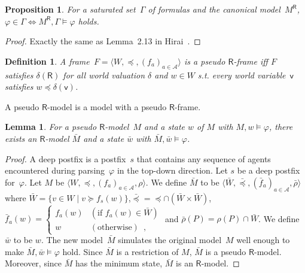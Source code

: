 \documentclass[doctor]{iscs-thesis}
\newcommand{\agents}{\mathcal A}
\newcommand{\tuple}[1]{\langle{#1}\rangle}
\newcommand{\R}[1]{{#1}^{\mathsf R}}
\newtheorem{proposition}{Proposition}
\newtheorem{definition}{Definition}
\newtheorem{lemma}{Lemma}
\begin{document}
\begin{proposition}
 \label{X}
 For a saturated set~$\Gamma$ of formulas and the canonical model~$\R
 M$,
 $\varphi\in\Gamma\Leftrightarrow \R M,\Gamma\models\varphi$ holds.
\end{proposition}
\begin{proof}
 Exactly the same as Lemma~2.13 in Hirai~\cite{hirailpar}.
\end{proof}

\begin{definition}
 A frame~$F = \tuple{W,\preceq, (f_a)_{a\in\agents}}$
 is a pseudo $\mathsf R$-frame iff $F$ satisfies
 $\delta(\mathsf R)$ for all world valuation
 $\delta$ and $w\in W$ s.t.
 every world variable~$\mathsf v$ satisfies
 $w\preceq \delta(\mathsf v)$.
\end{definition}
 A pseudo $\mathsf R$-model is a model with a pseudo $\mathsf R$-frame.

\begin{lemma}
 \label{pseudo-real}
 For a pseudo $\mathsf R$-model~$M$ and a state $w$ of $M$ with
 $M,w\models\varphi$,
 there exists an $\mathsf R$-model $\bar M$ and a state $\bar w$
 with $\bar M,\bar w\models\varphi$.
\end{lemma}
\begin{proof}
 A deep postfix is a postfix~$s$ that contains any sequence of agents
 encountered during parsing~$\varphi$ in the top-down direction.
 Let $s$ be a deep postfix for~$\varphi$. Let $M$ be
 $\tuple{W,\preceq,(f_a)_{a\in\agents},\rho}$.
 We define $\bar M$ to be $\tuple{\bar W,\bar\preceq,
 (\bar f_a)_{a\in\agents},\bar \rho}$ where
 $\bar W=\{v\in W\mid v\succeq f_s(w)\}$,$\bar\preceq =
 \preceq\cap (\bar W\times\bar W)$,
 $\bar f_a(w)= \begin{cases}
		    f_a(w)&(\mbox{if }f_a(w)\in\bar W)\\
		    w&(\mbox{otherwise})\enspace,
		   \end{cases}$
 and $\bar \rho(P) =\rho(P)\cap\bar W$.
 We define $\bar w$ to be $w$.
 The new model~$\bar M$ simulates the original model~$M$ well enough
 to make $\bar M,\bar w\models\varphi$ hold.
 Since $\bar M$ is a restriction of $M$, $\bar M$ is a pseudo
 $\mathsf R$-model.
 Moreover, since $\bar M$ has the minimum state, $\bar M$ is an
 $\mathsf R$-model.
\end{proof}
\end{document}
